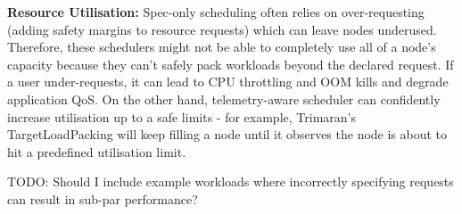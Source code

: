 \textbf{Resource Utilisation:} Spec-only scheduling often relies on
over-requesting (adding safety margins to resource requests) which can leave
nodes underused. Therefore, these schedulers might not be able to
completely use all of a node's capacity because they can't safely pack workloads
beyond the declared request. If a user under-requests, it can lead to CPU
throttling and OOM kills and degrade application QoS. On the other hand,
telemetry-aware scheduler can confidently increase utilisation up to a safe
limits - for example, Trimaran's TargetLoadPacking will keep filling a node
until it observes the node is about to hit a predefined utilisation limit.

TODO: Should I include example workloads where incorrectly specifying requests
can result in sub-par performance?


%
